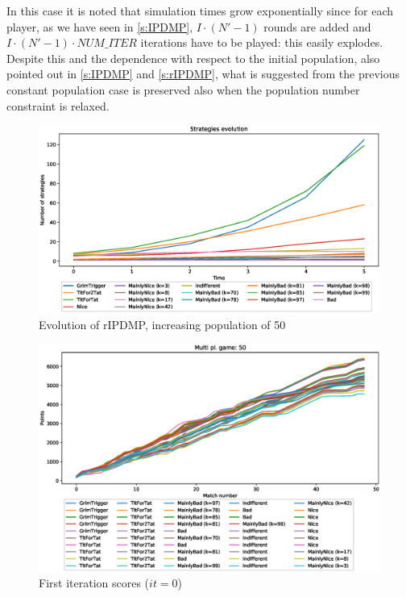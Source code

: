 \documentclass[journal,10pt,twoside]{IEEEtran}
\begin{document}
In this case it is noted that simulation times grow exponentially since for each player, as we have seen in \autoref{s:IPDMP}, $I\cdot(N'-1)$ rounds are added and $I\cdot(N'-1)\cdot{NUM\_ITER}$ iterations have to be played: this easily explodes. Despite this and the dependence with respect to the initial population, also pointed out in \autoref{s:IPDMP} and \autoref{s:rIPDMP}, what is suggested from the previous constant population case is preserved also when the population number constraint is relaxed.

\begin{figure}[!ht]
    \centering
    \includegraphics[width=1\columnwidth]{../img/ripdmp-incr/ripdmp-evolution-increasing-pop-50}
    \caption{Evolution of rIPDMP, increasing population of 50}
    \label{fig:incrR}
\end{figure}

\begin{figure}[!ht]
    \centering
    \includegraphics[width=1\columnwidth]{../img/ripdmp-incr/ripdmp-scores-increasing-pop-50-r0}
    \caption{First iteration scores ($it=0$)}
    \label{fig:incrFI}
\end{figure}
\end{document}
